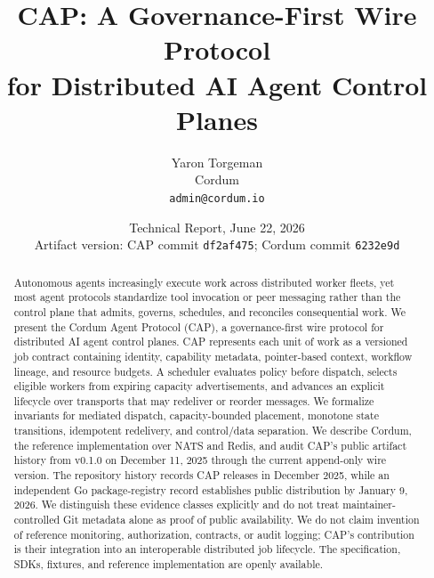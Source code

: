 \documentclass[10pt,twocolumn]{article}
\title{\vspace{-1.4em}\textbf{CAP: A Governance-First Wire Protocol\\for Distributed AI Agent Control Planes}}
\author{Yaron Torgeman\\\small Cordum\\\small \texttt{admin@cordum.io}}
\date{Technical Report, June 22, 2026\\\small Artifact version: CAP commit \texttt{df2af475}; Cordum commit \texttt{6232e9d}}
\begin{document}
\raggedbottom
\maketitle
\thispagestyle{fancy}

\begin{abstract}
Autonomous agents increasingly execute work across distributed worker fleets, yet most agent protocols standardize tool invocation or peer messaging rather than the control plane that admits, governs, schedules, and reconciles consequential work. We present the Cordum Agent Protocol (CAP), a governance-first wire protocol for distributed AI agent control planes. CAP represents each unit of work as a versioned job contract containing identity, capability metadata, pointer-based context, workflow lineage, and resource budgets. A scheduler evaluates policy before dispatch, selects eligible workers from expiring capacity advertisements, and advances an explicit lifecycle over transports that may redeliver or reorder messages. We formalize invariants for mediated dispatch, capacity-bounded placement, monotone state transitions, idempotent redelivery, and control/data separation. We describe Cordum, the reference implementation over NATS and Redis, and audit CAP's public artifact history from v0.1.0 on December 11, 2025 through the current append-only wire version. The repository history records CAP releases in December 2025, while an independent Go package-registry record establishes public distribution by January 9, 2026. We distinguish these evidence classes explicitly and do not treat maintainer-controlled Git metadata alone as proof of public availability. We do not claim invention of reference monitoring, authorization, contracts, or audit logging; CAP's contribution is their integration into an interoperable distributed job lifecycle. The specification, SDKs, fixtures, and reference implementation are openly available.
\end{abstract}












\printbibliography
\end{document}
